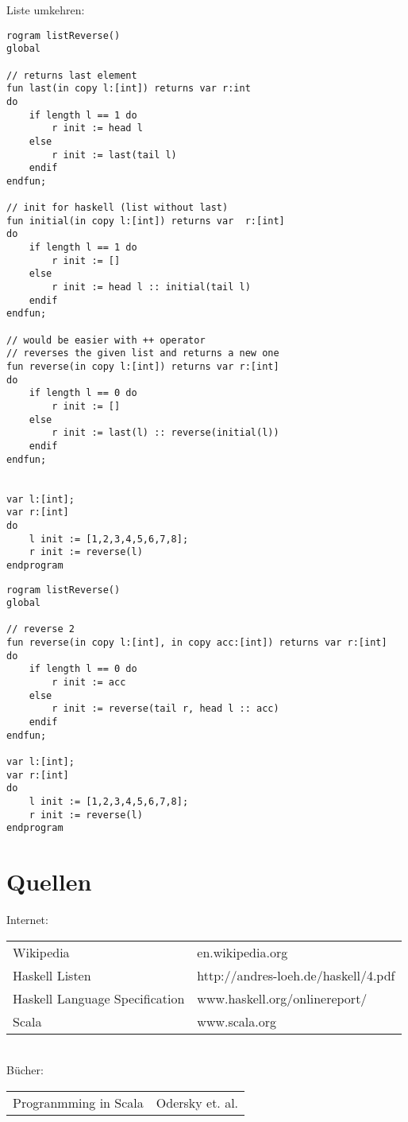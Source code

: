 \documentclass[a4paper,notitlepage,oneside]{scrartcl}
\begin{document}
\newpage
Liste umkehren:
\begin{lstlisting}[language=iml, caption=Liste reverse 1]
rogram listReverse()
global

// returns last element
fun last(in copy l:[int]) returns var r:int
do
	if length l == 1 do
		r init := head l
	else
		r init := last(tail l)
	endif
endfun;

// init for haskell (list without last)
fun initial(in copy l:[int]) returns var  r:[int]
do
	if length l == 1 do
		r init := []
	else
		r init := head l :: initial(tail l)
	endif
endfun;

// would be easier with ++ operator
// reverses the given list and returns a new one
fun reverse(in copy l:[int]) returns var r:[int]
do
	if length l == 0 do
		r init := []
	else
		r init := last(l) :: reverse(initial(l)) 
	endif
endfun;


var l:[int];
var r:[int]
do
	l init := [1,2,3,4,5,6,7,8];
	r init := reverse(l)
endprogram
\end{lstlisting}

\newpage
\begin{lstlisting}[language=iml, caption=Liste reverse 2]
rogram listReverse()
global

// reverse 2
fun reverse(in copy l:[int], in copy acc:[int]) returns var r:[int]
do
	if length l == 0 do
		r init := acc
	else
		r init := reverse(tail r, head l :: acc)
	endif
endfun;

var l:[int];
var r:[int]
do
	l init := [1,2,3,4,5,6,7,8];
	r init := reverse(l)
endprogram
\end{lstlisting}

\newpage
\section{Quellen}
Internet:\\
\begin{tabular}{l l}
Wikipedia & en.wikipedia.org \\
Haskell Listen  & http://andres-loeh.de/haskell/4.pdf \\
Haskell Language Specification & www.haskell.org/onlinereport/ \\
Scala & www.scala.org
\end{tabular} \\
Bücher: \\
\begin{tabular}{l l}
Progranmming in Scala & Odersky et. al. \\
\end{tabular}
\end{document}
